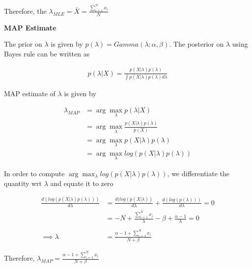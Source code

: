 \documentclass{article}
\begin{document}
\begin{addmargin}{1.5em}
\begin{addmargin}{1.5em}
        Therefore, the $\lambda_{MLE} = \bar{X} = \frac{\sum_{i = 1}^{N} x_i}{N}$

        \clearpage
        
        \textbf{MAP Estimate}
        
        The prior on $\lambda$ is given by $p(\lambda) = Gamma(\lambda; \alpha, \beta)$. The posterior on $\lambda$ using Bayes rule can be written as
        
        \begin{align*}
            p(\lambda | X) = \frac{p(X | \lambda)p(\lambda)}{\int p(X | \lambda)p(\lambda) d\lambda}
        \end{align*}
        
        MAP estimate of $\lambda$ is given by
        
        \begin{align*}
            \lambda_{MAP} &= \arg\max_{\lambda} p(\lambda | X) \\
                          &= \arg\max_{\lambda} \frac{p(X | \lambda)p(\lambda)}{p(X)} \\
                          &= \arg\max_{\lambda} p(X | \lambda)p(\lambda) \\
                          &= \arg\max_{\lambda} log(p(X | \lambda)p(\lambda))
        \end{align*}
        
        In order to compute $\arg\max_{\lambda} log(p(X | \lambda)p(\lambda))$, we differentiate the quantity wrt $\lambda$ and equate it to zero
        
        \begin{align*}
            \frac{d(log(p(X | \lambda)p(\lambda)))}{d\lambda} &= \frac{d(log(p(X | \lambda))}{d\lambda} + \frac{d(log(p(\lambda)))}{d\lambda} = 0 \\
                                                              &= -N + \frac{\sum_{i = 1}^{N} x_i}{\lambda} - \beta + \frac{\alpha - 1}{\lambda} = 0 \\\\
            \implies \lambda                                  &= \frac{\alpha - 1 + \sum_{i = 1}^{N} x_i}{N + \beta}
        \end{align*}
        
        Therefore, $\lambda_{MAP} = \frac{\alpha - 1 + \sum_{i = 1}^{N} x_i}{N + \beta}$
        
    \end{addmargin}
    
    
    

\end{addmargin}
\end{document}

